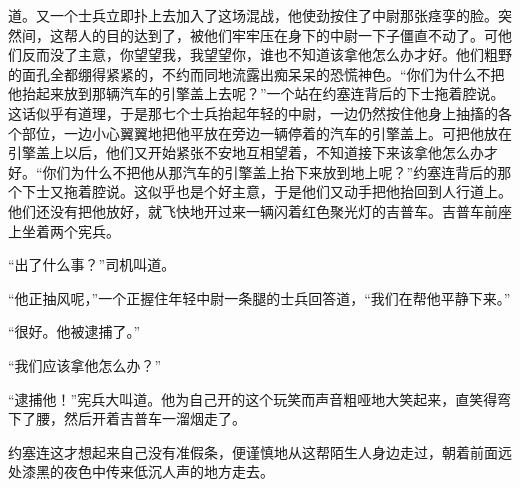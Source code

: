 道。又一个士兵立即扑上去加入了这场混战，他使劲按住了中尉那张痉孪的脸。突然间，这帮人的目的达到了，被他们牢牢压在身下的中尉一下子僵直不动了。可他们反而没了主意，你望望我，我望望你，谁也不知道该拿他怎么办才好。他们粗野的面孔全都绷得紧紧的，不约而同地流露出痴呆呆的恐慌神色。“你们为什么不把他抬起来放到那辆汽车的引擎盖上去呢？”一个站在约塞连背后的下士拖着腔说。这话似乎有道理，于是那七个士兵抬起年轻的中尉，一边仍然按住他身上抽搐的各个部位，一边小心翼翼地把他平放在旁边一辆停着的汽车的引擎盖上。可把他放在引擎盖上以后，他们又开始紧张不安地互相望着，不知道接下来该拿他怎么办才好。“你们为什么不把他从那汽车的引擎盖上抬下来放到地上呢？”约塞连背后的那个下士又拖着腔说。这似乎也是个好主意，于是他们又动手把他抬回到人行道上。他们还没有把他放好，就飞快地开过来一辆闪着红色聚光灯的吉普车。吉普车前座上坐着两个宪兵。

    “出了什么事？”司机叫道。

    “他正抽风呢，”一个正握住年轻中尉一条腿的士兵回答道，“我们在帮他平静下来。”

    “很好。他被逮捕了。”

    “我们应该拿他怎么办？”

    “逮捕他！”宪兵大叫道。他为自己开的这个玩笑而声音粗哑地大笑起来，直笑得弯下了腰，然后开着吉普车一溜烟走了。

    约塞连这才想起来自己没有准假条，便谨慎地从这帮陌生人身边走过，朝着前面远处漆黑的夜色中传来低沉人声的地方走去。

